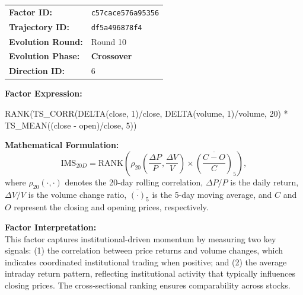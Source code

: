 \begin{tcolorbox}[
  colback=lightblue,
  colframe=darkblue,
  fonttitle=\bfseries,
  title={\faTag\ Institutional\_Momentum\_Score\_20D},
  arc=2mm,
  boxrule=0.5pt,
  breakable
]

\begin{tabular}{@{}ll@{}}
\textbf{Factor ID:} & \texttt{c57cace576a95356} \\
\textbf{Trajectory ID:} & \texttt{df5a496878f4} \\
\textbf{Evolution Round:} & Round 10 \\
\textbf{Evolution Phase:} & \colorbox{crossoverblue!20}{\textcolor{crossoverblue}{\textbf{Crossover}}} \\
\textbf{Direction ID:} & 6 \\
\end{tabular}

\vspace{0.3cm}

\textbf{Factor Expression:}
\begin{tcolorbox}[colback=darkblue!5, colframe=darkblue, boxrule=0.3pt, arc=1mm]
\small\ttfamily
RANK(TS\_CORR(DELTA(close, 1)/close, DELTA(volume, 1)/volume, 20) * TS\_MEAN((close - open)/close, 5))
\end{tcolorbox}

\textbf{Mathematical Formulation:}
\[
\text{IMS}_{20D} = \text{RANK}\left(\rho_{20}\left(\frac{\Delta P}{P}, \frac{\Delta V}{V}\right) \times \overline{\left(\frac{C - O}{C}\right)}_{5}\right),
\]
\small
where $\rho_{20}(\cdot,\cdot)$ denotes the 20-day rolling correlation, $\Delta P/P$ is the daily return, $\Delta V/V$ is the volume change ratio, $\overline{(\cdot)}_5$ is the 5-day moving average, and $C$ and $O$ represent the closing and opening prices, respectively.

\vspace{0.2cm}

\textbf{Factor Interpretation:}\\
\small
This factor captures institutional-driven momentum by measuring two key signals: (1) the correlation between price returns and volume changes, which indicates coordinated institutional trading when positive; and (2) the average intraday return pattern, reflecting institutional activity that typically influences closing prices. The cross-sectional ranking ensures comparability across stocks.

\end{tcolorbox}

